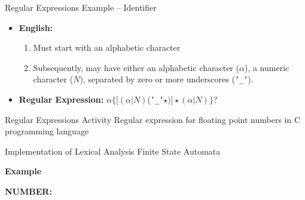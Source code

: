 \documentclass{beamer}
\newcommand{\myminorheader}[1]{
	{\color{BrickRed}
		\begin{Large}
			{\fontfamily{\sfdefault}\selectfont\textbf{#1}}
		\end{Large}
	}
}
\begin{document}
\begin{frame}[fragile]{Regular Expressions}
{Example -- Identifier}
\begin{itemize}
	\item \textbf{English:}
	\begin{enumerate}
		\item Must start with an alphabetic character
		\item Subsequently, may have either an alphabetic character ($\alpha$), a numeric character ($N$), separated by zero or more underscores (\texttt{'\_'}).
	\end{enumerate}
	\pause
	\item \textbf{Regular Expression: }$\alpha\lbrace\lbrack(\alpha | N)$(\texttt{'\_'}$\star)\rbrack\star(\alpha | N)\rbrace?$
\end{itemize}
\end{frame}

\begin{frame}[fragile]{Regular Expressions}
{Activity}
Regular expression for floating point numbers in C programming language

\end{frame}

\begin{frame}{Implementation of Lexical Analysis}
{Finite State Automata}
\myminorheader{Example}

\textbf{NUMBER:}
\pause
\begin{center}

\end{center}

\end{frame}
\end{document}
